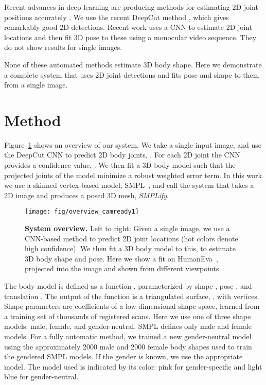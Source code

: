 \documentclass[runningheads]{llncs}
\begin{document}
Recent advances in deep learning are producing methods for estimating
2D joint positions accurately \cite{Leonid2016DeepCut,Wei:CVPR:2016}.
We use the recent DeepCut method \cite{Leonid2016DeepCut}, which gives remarkably good 2D detections.
Recent work \cite{Zhou:CVPR:2016} uses a CNN to
estimate 2D joint locations and then fit 3D pose
to these using a monocular video sequence. They do not show results for
single images.


None of these automated methods estimate 3D body shape.
Here we demonstrate a complete system that uses 2D joint detections and
fits pose and shape to them from a single image.
 
\section{Method}
\label{sec:method}


Figure~\ref{fig:overview} shows an overview of our system.
We take a single input image, and use the DeepCut CNN
\cite{Leonid2016DeepCut} to predict 2D body joints, .
For each 2D joint  the CNN provides a confidence value, .
We then fit a 3D body model such that the projected joints of the
model minimize a robust weighted error term.
In this work we use a skinned vertex-based model,
SMPL~\cite{SMPL:2015}, and call the system that takes a 2D image and produces
a posed 3D mesh, {\em SMPLify}.

\begin{figure}[t]
\centerline{
\texttt{[image: fig/overview\_camready1]}
}
\caption{{\bf System overview.} Left to right: Given a single image, we use a
  CNN-based method to predict 2D joint locations (hot colors
    denote high confidence). We then fit a 3D body model to this, to estimate 3D body shape and pose.
Here we show a fit on HumanEva~\cite{HumanEva:2010}, projected into
the image and shown from different viewpoints.}
\label{fig:overview}
\end{figure}

The body model is defined as a function
, parameterized by shape
, pose , and translation . The output of the function is a triangulated surface, , with  vertices.
Shape parameters  are coefficients of a low-dimensional
shape space, learned from a training set of thousands of registered
scans.
Here we use one of three shape models: male, female, and
gender-neutral. SMPL defines only male and female models.
For a fully automatic method, we trained a new gender-neutral model
using the approximately 2000 male and 2000 female body shapes used to
train the gendered SMPL models.
If the gender is known, we use the appropriate model.
The model used is indicated by its color: pink for gender-specific
and light blue for gender-neutral.
\end{document}
